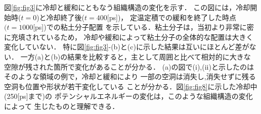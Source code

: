 図\ref{fig:fig3}に冷却と緩和にともなう組織構造の変化を示す．
この図には，冷却開始時($t=0$)と冷却終了後($t=400$[ps])，
定温定積での緩和を終了した時点$(t=1000$[ps])での粘土分子配置
を示している．粘土分子は，当初より非常に密に充填されているため，
冷却や緩和によって粘土分子の全体的な配置は大きく変化していない．
特に図\ref{fig:fig3}-(b)と(c)に示した結果は互いにほとんど差がない．
一方(a)と(b)の結果を比較すると，主として周囲と比べて相対的に大きな
空隙が残された箇所で変化があることが分かる．
(a)の図で(i),(ii)と示したのはそのような領域の例で，冷却と緩和により
一部の空洞は消失し,消失せずに残る空洞も位置や形状が若干変化している
ことが分かる．図\ref{fig:fig8}に示した冷却中(250[ps]まで)の
ポテンシャルエネルギーの変化は，このような組織構造の変化によって
生じたものと理解できる．
